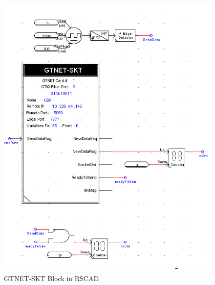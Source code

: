 \begin{figure}[h]
\includegraphics[width=\textwidth]{Figures/skt.png}
\caption{GTNET-SKT Block in RSCAD}\label{fig:skt}
\end{figure}



